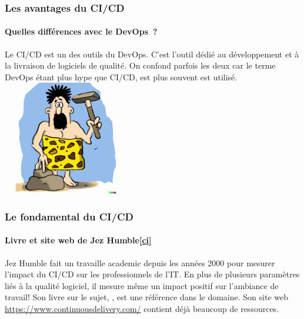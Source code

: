 \documentclass{beamer}
\begin{document}
    \begin{frame}
        \frametitle{Les avantages du CI/CD}
        \framesubtitle{Quelles différences avec le DevOps~?}
        \transdissolve
        Le CI/CD est un des outils du DevOps.
        \bigbreak
        C'est l'outil dédié au développement et à la livraison de logiciels de qualité.
        On confond parfois les deux car le terme DevOps étant plus hype que CI/CD, est plus souvent est utilisé.
        \bigbreak
        \centering
        \includegraphics[width=5cm]{image/caveman-using-a-sophisticated-tool.png}
    \end{frame}

    \begin{frame}
        \frametitle{Le fondamental du CI/CD}
        \framesubtitle{Livre et site web de Jez Humble\cref{ci}}
        \transdissolve
        Jez Humble fait un travaille academic depuis les années 2000 pour mesurer l'impact du CI/CD sur les professionnels de l'IT.
        \bigbreak
        En plus de plusieurs paramètres liés à la qualité logiciel, il mesure même un impact positif sur l'ambiance de travail!
        \bigbreak
        Son livre sur le sujet, , est une référence dans le domaine.
        Son site web \url{https://www.continuousdelivery.com/} contient déjà beaucoup de ressources.
    \end{frame}
\end{document}
